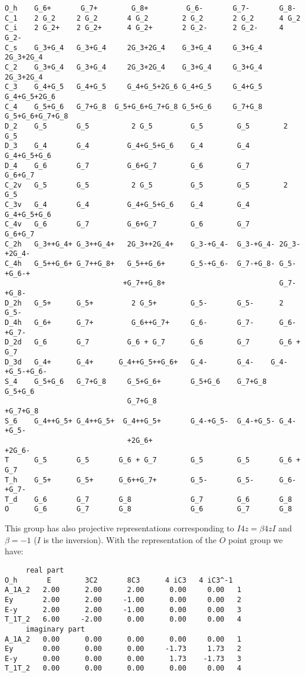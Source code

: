 \documentclass[12pt,a4paper]{article}
\begin{document}
\begin{footnotesize}
\begin{verbatim}
O_h    G_6+       G_7+        G_8+         G_6-       G_7-       G_8-
C_1    2 G_2     2 G_2       4 G_2        2 G_2       2 G_2      4 G_2
C_i    2 G_2+    2 G_2+      4 G_2+       2 G_2-      2 G_2-     4 G_2-
C_s    G_3+G_4   G_3+G_4     2G_3+2G_4    G_3+G_4     G_3+G_4   2G_3+2G_4
C_2    G_3+G_4   G_3+G_4     2G_3+2G_4    G_3+G_4     G_3+G_4   2G_3+2G_4
C_3    G_4+G_5   G_4+G_5     G_4+G_5+2G_6 G_4+G_5     G_4+G_5   G_4+G_5+2G_6
C_4    G_5+G_6   G_7+G_8  G_5+G_6+G_7+G_8 G_5+G_6     G_7+G_8 G_5+G_6+G_7+G_8
D_2    G_5       G_5          2 G_5         G_5        G_5        2 G_5
D_3    G_4       G_4         G_4+G_5+G_6    G_4        G_4       G_4+G_5+G_6
D_4    G_6       G_7         G_6+G_7        G_6        G_7       G_6+G_7
C_2v   G_5       G_5          2 G_5         G_5        G_5        2 G_5
C_3v   G_4       G_4         G_4+G_5+G_6    G_4        G_4       G_4+G_5+G_6
C_4v   G_6       G_7         G_6+G_7        G_6        G_7       G_6+G_7
C_2h   G_3++G_4+ G_3++G_4+   2G_3++2G_4+    G_3-+G_4-  G_3-+G_4- 2G_3-+2G_4- 
C_4h   G_5++G_6+ G_7++G_8+   G_5++G_6+      G_5-+G_6-  G_7-+G_8- G_5-+G_6-+
                            +G_7++G_8+                           G_7-+G_8- 
D_2h   G_5+      G_5+         2 G_5+        G_5-       G_5-      2 G_5-
D_4h   G_6+      G_7+         G_6++G_7+     G_6-       G_7-      G_6-+G_7-
D_2d   G_6       G_7         G_6 + G_7      G_6        G_7       G_6 + G_7
D_3d   G_4+      G_4+      G_4++G_5++G_6+   G_4-       G_4-    G_4-+G_5-+G_6-
S_4    G_5+G_6   G_7+G_8     G_5+G_6+       G_5+G_6    G_7+G_8   G_5+G_6
                             G_7+G_8                             +G_7+G_8
S_6    G_4++G_5+ G_4++G_5+  G_4++G_5+       G_4-+G_5-  G_4-+G_5- G_4-+G_5-
                             +2G_6+                               +2G_6-
T      G_5       G_5       G_6 + G_7        G_5        G_5       G_6 + G_7
T_h    G_5+      G_5+      G_6++G_7+        G_5-       G_5-      G_6-+G_7-
T_d    G_6       G_7       G_8              G_7        G_6       G_8
O      G_6       G_7       G_8              G_6        G_7       G_8    
\end{verbatim}
\end{footnotesize}
This group has also projective representations corresponding to
$I {4z} = \beta {4z} I$ and $\beta=-1$ ($I$ is the inversion). With
the representation of the $O$ point group we have:
\begin{verbatim}
     real part
O_h       E        3C2       8C3      4 iC3   4 iC3^-1  
A_1A_2   2.00      2.00      2.00      0.00     0.00   1
Ey       2.00      2.00     -1.00      0.00     0.00   2
E-y      2.00      2.00     -1.00      0.00     0.00   3
T_1T_2   6.00     -2.00      0.00      0.00     0.00   4
     imaginary part
A_1A_2   0.00      0.00      0.00      0.00     0.00   1
Ey       0.00      0.00      0.00     -1.73     1.73   2
E-y      0.00      0.00      0.00      1.73    -1.73   3 
T_1T_2   0.00      0.00      0.00      0.00     0.00   4
\end{verbatim}
\end{document}
